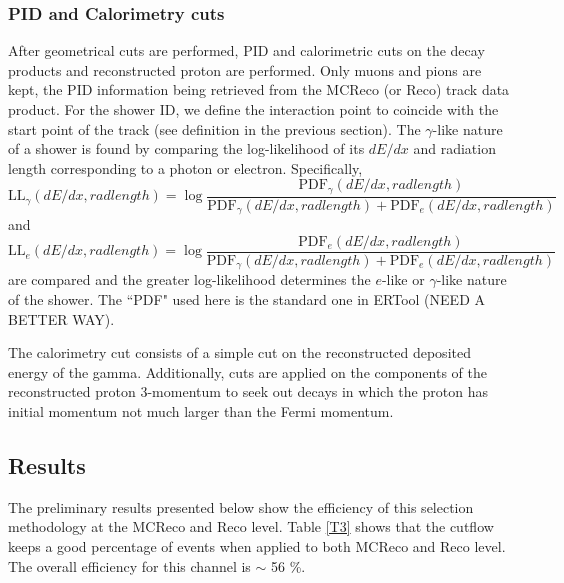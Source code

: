\documentclass[a4paper, 10pt]{article}
\begin{document}
\subsubsection{PID and Calorimetry cuts }
\label{ID}
After geometrical cuts are performed, PID and calorimetric cuts on the decay products and reconstructed proton are performed. Only muons and pions are kept, the PID information being retrieved from the MCReco (or Reco) track data product. For the shower ID, we define the interaction point to coincide with the start point of the track (see definition in the previous section). The $\gamma$-like nature of a shower is found by comparing the log-likelihood of its $dE/dx$ and radiation length corresponding to a photon or electron.
Specifically, 
\[\text{LL}_{\gamma}(dE/dx, rad length) = \log \frac{ \text{PDF}_{\gamma}(dE/dx, rad length) }{ \text{PDF}_{\gamma}(dE/dx, rad length) + \text{PDF}_{e}(dE/dx, rad length) }\]
and
\[\text{LL}_{e}(dE/dx, rad length) = \log \frac{ \text{PDF}_{e}(dE/dx, rad length) }{ \text{PDF}_{\gamma}(dE/dx, rad length) + \text{PDF}_{e}(dE/dx, rad length) }\]
are compared and the greater log-likelihood determines the $e$-like or $\gamma$-like nature of the shower. The ``PDF"  used here is the standard one in ERTool (NEED A BETTER WAY).

The calorimetry cut consists of a simple cut on the reconstructed deposited energy of the gamma. Additionally, cuts are applied on the components of the reconstructed proton 3-momentum to seek out decays in which the proton has initial momentum not much larger than the Fermi momentum.

\subsection{Results}

The preliminary results presented below show the efficiency of this selection methodology at the MCReco and Reco level. 
Table \ref{T3} shows that the cutflow keeps a good percentage of events when applied to both MCReco and Reco level.  The overall efficiency for this channel is $\sim$ 56 \%.
\end{document}
